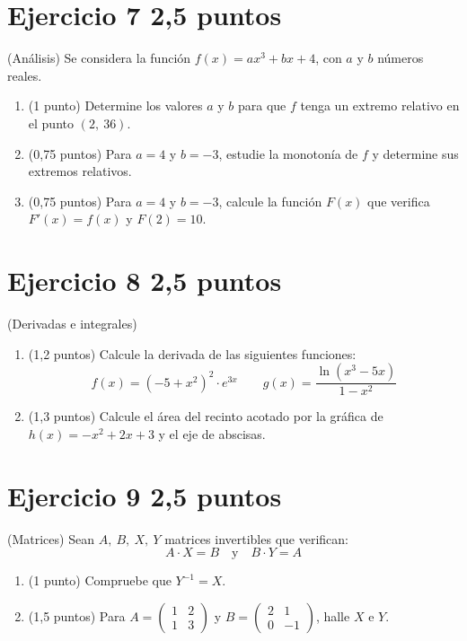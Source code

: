 \documentclass[11pt]{article}
\begin{document}
\clearpage
\section*{Ejercicio 7 \hfill 2,5 puntos} (Análisis) Se considera la función \( f(x) = ax^3 + bx + 4 \), con \( a \) y \( b \) números reales.

\begin{enumerate}[label=(\alph*)]

  \item (1 punto)  Determine los valores \( a \) y \( b \) para que \( f \) tenga un extremo relativo en el punto \( (2,\ 36) \).

  

  \item (0,75 puntos)  Para \( a = 4 \) y \( b = -3 \), estudie la monotonía de \( f \) y determine sus extremos relativos.

  

  \item (0,75 puntos)  Para \( a = 4 \) y \( b = -3 \), calcule la función \( F(x) \) que verifica \( F'(x) = f(x) \) y \( F(2) = 10 \).

  

\end{enumerate}



\section*{Ejercicio 8 \hfill 2,5 puntos} (Derivadas e integrales)

\begin{enumerate}[label=(\alph*)]

  \item (1,2 puntos)  Calcule la derivada de las siguientes funciones:
  \[
  f(x) = (-5 + x^2)^2 \cdot e^{3x} \quad\quad 
  g(x) = \frac{\ln(x^3 - 5x)}{1 - x^2}
  \]

  

  \item (1,3 puntos)  Calcule el área del recinto acotado por la gráfica de \( h(x) = -x^2 + 2x + 3 \) y el eje de abscisas.

  

\end{enumerate}



\clearpage
\section*{Ejercicio 9 \hfill 2,5 puntos} (Matrices) Sean \( A,\ B,\ X,\ Y \) matrices invertibles que verifican:
\[
A \cdot X = B \quad \text{y} \quad B \cdot Y = A
\]

\begin{enumerate}[label=(\alph*)]

  \item (1 punto)  Compruebe que \( Y^{-1} = X \).

  

  \item (1,5 puntos)  Para \( A = \begin{pmatrix} 1 & 2 \\ 1 & 3 \end{pmatrix} \) y 
  \( B = \begin{pmatrix} 2 & 1 \\ 0 & -1 \end{pmatrix} \), halle \( X \) e \( Y \).

  

\end{enumerate}
\end{document}
